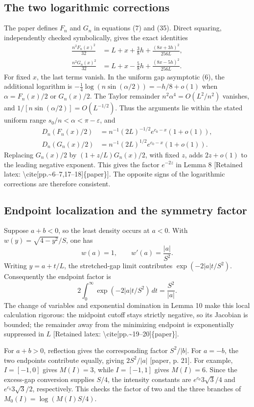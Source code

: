 \documentclass[10pt]{article}
\begin{document}
\subsection*{The two logarithmic corrections}
The paper defines \(F_n\) and \(G_n\) in equations (7) and (35). Direct squaring, independently checked symbolically, gives the exact identities \[\begin{aligned}
\frac{n^2F_n(x)^2}{32}
 &=L+x+\frac38h+\frac{(8x+3h)^2}{256L},\\
\frac{n^2G_n(x)^2}{32}
 &=L+x-\frac58h+\frac{(8x-5h)^2}{256L}.\end{aligned}\] For fixed \(x\), the last terms vanish. In the uniform gap asymptotic (6), the additional logarithm is \(-\tfrac14\log(n\sin(\alpha/2))=-h/8+o(1)\) when \(\alpha=F_n(x)/2\) or \(G_n(x)/2\). The Taylor remainder \(n^2\alpha^4=O(L^2/n^2)\) vanishes, and \(1/[n\sin(\alpha/2)]=O(L^{-1/2})\). Thus the arguments lie within the stated uniform range \(s_0/n<\alpha<\pi-\varepsilon\), and \[\begin{aligned}
D_n(F_n(x)/2)&=n^{-1}(2L)^{-1/2}e^{c_0-x}(1+o(1)),\\
D_n(G_n(x)/2)&=n^{-1}(2L)^{1/2}e^{c_0-x}(1+o(1)).\end{aligned}\] Replacing \(G_n(x)/2\) by \((1+z/L)G_n(x)/2\), with fixed \(z\), adds \(2z+o(1)\) to the leading negative exponent. This gives the factor \(e^{-2z}\) in Lemma 8 [Retained latex: \textbackslash{}cite[pp.\textasciitilde{}6--7,17--18]\{paper\}]. The opposite signs of the logarithmic corrections are therefore consistent.\par
\subsection*{Endpoint localization and the symmetry factor}
Suppose \(a+b<0\), so the least density occurs at \(a<0\). With \(w(y)=\sqrt{4-y^2}/S\), one has \[w(a)=1,\qquad w'(a)=\frac{|a|}{S^2}.\] Writing \(y=a+t/L\), the stretched-gap limit contributes \(\exp(-2|a|t/S^2)\). Consequently the endpoint factor is \[2\int_0^\infty \exp(-2|a|t/S^2)\,dt=\frac{S^2}{|a|}.\] The change of variables and exponential domination in Lemma 10 make this local calculation rigorous: the midpoint cutoff stays strictly negative, so its Jacobian is bounded; the remainder away from the minimizing endpoint is exponentially suppressed in \(L\) [Retained latex: \textbackslash{}cite[pp.\textasciitilde{}19--20]\{paper\}].\par
For \(a+b>0\), reflection gives the corresponding factor \(S^2/|b|\). For \(a=-b\), the two endpoints contribute equally, giving \(2S^2/|a|\) [paper, p. 21]. For example, \(I=[-1,0]\) gives \(M(I)=3\), while \(I=[-1,1]\) gives \(M(I)=6\). Since the excess-gap conversion supplies \(S/4\), the intensity constants are \(e^{c_0}3\sqrt3/4\) and \(e^{c_0}3\sqrt3/2\), respectively. This checks the factor of two and the three branches of \(M_0(I)=\log(M(I)S/4)\).\par
\end{document}
